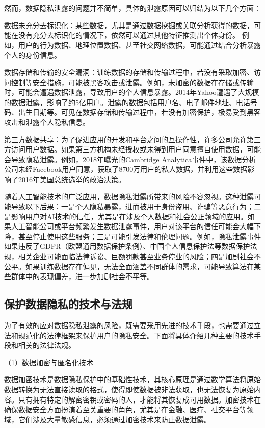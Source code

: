 然而，数据隐私泄露的问题并不简单，具体的泄露原因可以归结为以下几个方面：

数据未充分去标识化：某些数据，尤其是通过数据挖掘或关联分析获得的数据，可能在没有充分去标识化的情况下，依然可以通过其他特征推测出个体身份。
例如，用户的行为数据、地理位置数据、甚至社交网络数据，可能通过结合分析暴露个人的身份信息。

数据存储和传输的安全漏洞：训练数据的存储和传输过程中，若没有采取加密、访问控制等安全措施，可能被黑客攻击或泄露。例如，未加密的数据在存储或传输时，可能会遭遇数据泄露，导致用户的个人信息暴露。2014年Yahoo遭遇了大规模的数据泄露，影响了约5亿用户。泄露的数据包括用户名、电子邮件地址、电话号码、出生日期等。可见在数据存储和传输过程中，若没有加密保护，极易受到黑客攻击和泄露个人隐私信息。

第三方数据共享：为了促进应用的开发和平台之间的互操作性，许多公司允许第三方访问用户数据。如果第三方机构未经授权或未得到用户同意擅自使用数据，可能会导致隐私泄露。例如，2018年曝光的Cambridge Analytica事件中，该数据分析公司未经Facebook用户同意，获取了8700万用户的私人数据，并利用这些数据影响了2016年美国总统选举的政治决策。

随着人工智能技术的广泛应用，数据隐私泄露所带来的风险不容忽视。这种泄露可能导致以下后果：一是个人隐私暴露，进而被用于身份盗用、诈骗等恶意行为；二是影响用户对AI技术的信任，尤其是在涉及个人数据和社会公正领域的应用。如果人工智能公司或平台频繁发生数据泄露事件，用户对该平台的信任可能会大幅下降，甚至停止使用这些服务；三是可能引发法律和伦理问题。例如，隐私泄露事件如果违反了GDPR（欧盟通用数据保护条例）、中国个人信息保护法等数据保护法规，相关企业可能面临法律诉讼、巨额罚款甚至业务停业的风险；四是加剧社会不公平。如果训练数据存在偏见，无法全面涵盖不同群体的需求，可能导致算法在某些群体中的表现偏差，进一步加剧社会不平等。

\subsection{保护数据隐私的技术与法规}
为了有效的应对数据隐私泄露的风险，既需要采用先进的技术手段，也需要通过立法和规范化的法律框架来保护用户的隐私安全。下面将具体介绍几种主要的技术手段和相关的法律法规。

（1）数据加密与匿名化技术

数据加密技术是数据隐私保护中的基础性技术，其核心原理是通过数学算法将原始数据转换为无法直接读取的格式，使得即使数据被非法获取，也无法恢复为原始内容。只有拥有特定的解密密钥或密码的人，才能将其恢复成可用数据。加密技术在确保数据安全方面扮演着至关重要的角色，尤其是在金融、医疗、社交平台等领域，它们涉及大量敏感信息，必须通过加密技术来防止数据泄露。

